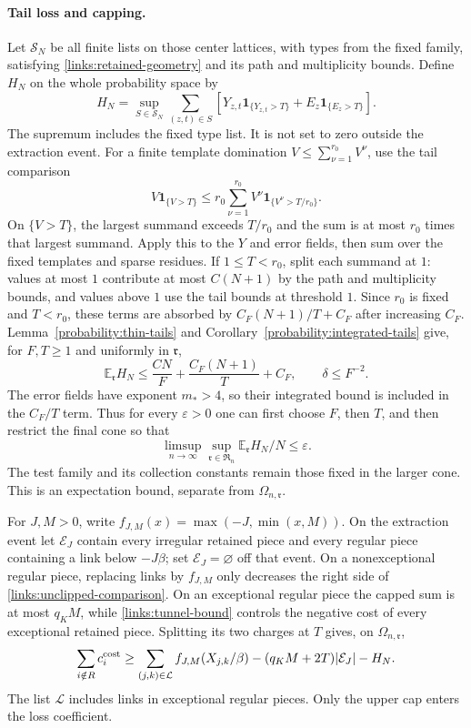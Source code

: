 \paragraph{Tail loss and capping.}
Let \(\mathcal S_N\) be all finite lists on those center lattices, with
types from the fixed family, satisfying
\eqref{links:retained-geometry} and its path and multiplicity bounds.
Define \(H_N\) on the whole probability space by
\[
 H_N=\sup_{S\in\mathcal S_N}\sum_{(z,t)\in S}
       \left[Y_{z,t}\mathbf1_{\{Y_{z,t}>T\}}
          +E_z\mathbf1_{\{E_z>T\}}\right].
\]
The supremum includes the fixed type list. It is not set to zero
outside the extraction event. For a finite template domination
\(V\le\sum_{\nu=1}^{r_0}V^\nu\), use the tail comparison
\[
 V\mathbf1_{\{V>T\}}
 \le r_0\sum_{\nu=1}^{r_0}
          V^\nu\mathbf1_{\{V^\nu>T/r_0\}}.
\]
On \(\{V>T\}\), the largest summand exceeds \(T/r_0\) and the sum is
at most \(r_0\) times that largest summand. Apply this to the \(Y\)
and error fields, then sum over the fixed templates and sparse
residues. If \(1\le T<r_0\), split each summand at \(1\): values at
most \(1\) contribute at most \(C(N+1)\) by the path and multiplicity
bounds, and values above \(1\) use the tail bounds at threshold \(1\).
Since \(r_0\) is fixed and \(T<r_0\), these terms are absorbed by
\(C_F(N+1)/T+C_F\) after increasing \(C_F\). Lemma~\ref{probability:thin-tails} and
Corollary~\ref{probability:integrated-tails} give, for \(F,T\ge1\)
and uniformly in \(\mathfrak r\),
\[
 \mathbb E_{\mathfrak r}H_N
 \le \frac{CN}{F}+\frac{C_F(N+1)}{T}+C_F,
 \qquad \delta\le F^{-2}.
\]
The error fields have exponent \(m_*>4\), so their integrated bound
is included in the \(C_F/T\) term. Thus for every \(\varepsilon>0\)
one can first choose \(F\), then \(T\), and then restrict the final
cone so that
\begin{equation}
 \limsup_{n\to\infty}\sup_{\mathfrak r\in\mathfrak R_n}
       \mathbb E_{\mathfrak r}H_N/N\le\varepsilon.
 \label{links:tail-error}
\end{equation}
The test family and its collection constants remain those fixed in
the larger cone. This is an expectation bound, separate from
\(\Omega_{n,\mathfrak r}\).

For \(J,M>0\), write \(f_{J,M}(x)=\max(-J,\min(x,M))\). On the
extraction event let \(\mathcal E_J\) contain every irregular retained
piece and every regular piece containing a link below \(-J\beta\);
set \(\mathcal E_J=\varnothing\) off that event. On a nonexceptional
regular piece, replacing links by \(f_{J,M}\) only decreases the right
side of \eqref{links:unclipped-comparison}. On an exceptional regular
piece the capped sum is at most \(q_KM\), while
\eqref{links:tunnel-bound} controls the negative cost of every
exceptional retained piece. Splitting its two charges at \(T\) gives,
on \(\Omega_{n,\mathfrak r}\),
\begin{equation}
 \sum_{i\notin R}c_i^{\rm cost}
 \ge\sum_{(j,k)\in\mathcal L}f_{J,M}(X_{j,k}/\beta)
                    -(q_KM+2T)|\mathcal E_J|-H_N.
 \label{links:master}
\end{equation}
The list \(\mathcal L\) includes links in exceptional regular pieces.
Only the upper cap enters the loss coefficient.

